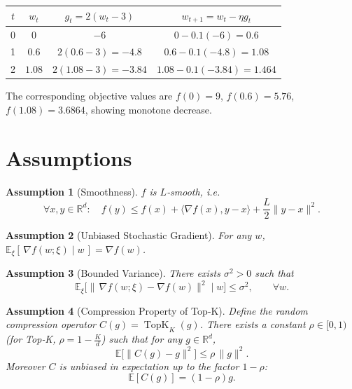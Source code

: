 \documentclass{article}
\newtheorem{assumption}{Assumption}
\newcommand{\TopK}[2]{\operatorname{TopK}_{#1}(#2)} %
\begin{document}
\begin{center}
\begin{tabular}{c|c|c|c}
$t$ & $w_t$ & $g_t=2(w_t-3)$ & $w_{t+1}=w_t-\eta g_t$ \\ \midrule
0 & $0$ & $-6$ & $0-0.1(-6)=0.6$ \\
1 & $0.6$ & $2(0.6-3)=-4.8$ & $0.6-0.1(-4.8)=1.08$ \\
2 & $1.08$ & $2(1.08-3)=-3.84$ & $1.08-0.1(-3.84)=1.464$ \\
\end{tabular}
\end{center}
The corresponding objective values are $f(0)=9$, $f(0.6)=5.76$, $f(1.08)=3.6864$, showing monotone decrease.

\newpage

\section*{Assumptions}
\begin{assumption}[Smoothness]\label{as:smooth}
$f$ is $L$‑smooth, i.e.
\[
\forall x,y\in\mathbb{R}^{d}:\quad
f(y)\le f(x)+\langle\nabla f(x),y-x\rangle+\frac{L}{2}\|y-x\|^{2}.
\]
\end{assumption}

\begin{assumption}[Unbiased Stochastic Gradient]\label{as:unbiased}
For any $w$, $\mathbb{E}_{\xi}[\,\nabla f(w;\xi)\mid w\,]=\nabla f(w)$.
\end{assumption}

\begin{assumption}[Bounded Variance]\label{as:variance}
There exists $\sigma^{2}>0$ such that
\[
\mathbb{E}_{\xi}\big[\|\,\nabla f(w;\xi)-\nabla f(w)\|^{2}\mid w\big]\le\sigma^{2},
\qquad\forall w.
\]
\end{assumption}

\begin{assumption}[Compression Property of Top‑K]\label{as:compress}
Define the random compression operator $C(g)=\TopK{K}{g}$.  
There exists a constant $\rho\in[0,1)$ (for Top‑K, $\rho=1-\frac{K}{d}$) such that for any $g\in\mathbb{R}^{d}$,
\[
\mathbb{E}\big[\|C(g)-g\|^{2}\big]\le\rho\,\|g\|^{2}.
\]
Moreover $C$ is unbiased in expectation up to the factor $1-\rho$:
\[
\mathbb{E}[C(g)]= (1-\rho) g .
\]
\end{assumption}
\end{document}
